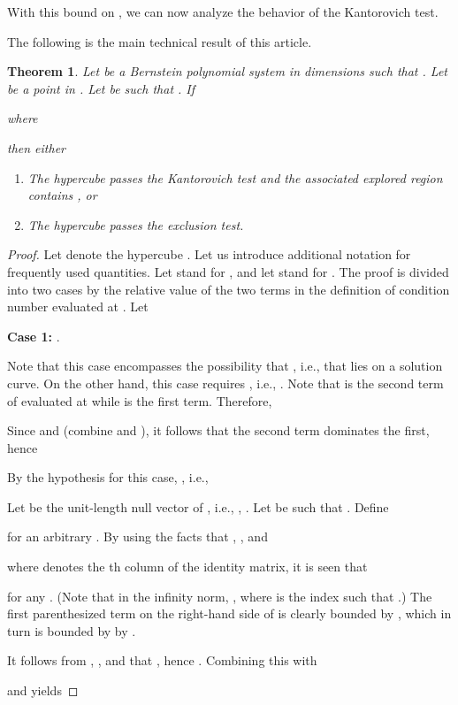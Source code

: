 \documentclass{article}
\newcommand\eref[1]{}
\newtheorem{theorem}{Theorem}[section]
\begin{document}
With this bound on , we can now analyze the behavior of the Kantorovich test.  


The following is the main technical result of this article.
\begin{theorem}
\label{thm2} Let  be a Bernstein polynomial system in  dimensions such that .
Let  be a point in .
Let  be such that . If

where

then either
\begin{enumerate}
\item The hypercube  passes the Kantorovich test
and the associated explored region  contains , or 
\item
The hypercube  passes the exclusion test.
\end{enumerate}
\end{theorem}
\begin{proof}
Let  denote the hypercube . 
Let us introduce additional notation for frequently used quantities.
Let  stand for , and
let  
stand for .
The proof is
divided into two cases by the relative value of the two
terms in the definition of condition number \eref{cond_def} 
evaluated at .
Let 


\begin{flushleft} \textbf{Case 1: } .
\end{flushleft}
Note that this case encompasses the possibility that , i.e.,
that  lies on a solution curve.  On the other hand, this
case requires , i.e., .
Note that  is the second term of \eref{cond_def} evaluated
at  while  is the first term.  Therefore,

Since  and 
(combine \eref{eq:Mpinvineq} and \eref{eq:k1def}), it follows
that the second term dominates the first, hence 

By the hypothesis for this case, , i.e.,


Let  be the unit-length null vector of , i.e.,
, .  Let  be such that
. Define 

for an arbitrary . By using the facts that
, , and

where  denotes the th column of the identity matrix, it is
seen that

for any . 
(Note that in the infinity norm, , 
where  is the index such that .)
The first parenthesized
term on the right-hand side of \eref{eta_ineq} is clearly bounded
by , which in turn is bounded by  by
\eref{eq:case1phibd}.

It follows from \eref{eq:case1condf}, \eref{eq:Mpinvineq}, and
\eref{eq:k0def} that , hence
.  Combining this with
\eref{deltahatcond} 
and \eref{eq:case1condf}
yields


\end{proof}
\end{document}
